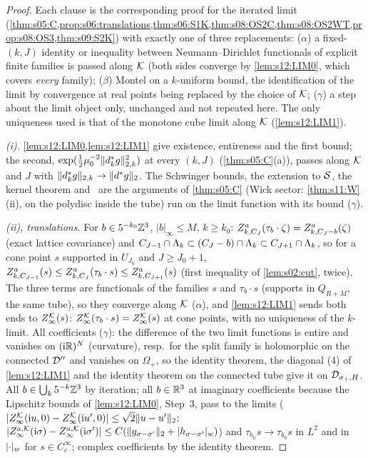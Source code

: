 \begin{proof}
Each clause is the corresponding proof for the iterated limit (\cref{thm:s05:C,prop:s06:translations,thm:s06:S1K,thm:s08:OS2C,thm:s08:OS2WT,prop:s08:OS3,thm:s09:S2K}) with exactly one of three replacements: ($\alpha$) a fixed-$(k,J)$ identity or inequality between Neumann--Dirichlet functionals of explicit finite families is passed along $\mathcal K$ (both sides converge by \cref{lem:s12:LIM0}, which covers \emph{every} family); ($\beta$) Montel on a $k$-uniform bound, the identification of the limit by convergence at real points being replaced by the choice of $\mathcal K$; ($\gamma$) a step about the limit object only, unchanged and not repeated here. The only uniqueness used is that of the monotone cube limit along $\mathcal K$ (\cref{lem:s12:LIM1}).

\emph{(i).} \cref{lem:s12:LIM0,lem:s12:LIM1} give existence, entireness and the first bound; the second, $\exp(\tfrac12\mu_0^{-2}\lVert d^{*}_kg\rVert^2_{2,k})$ at every $(k,J)$ (\cref{thm:s05:C}(a)), passes along $\mathcal K$ and $J$ with $\lVert d^{*}_kg\rVert_{2,k}\to\lVert d^{*} g\rVert_2$. The Schwinger bounds, the extension to $\mathcal S$, the kernel theorem and \Ezz\ are the arguments of \cref{thm:s05:C} (Wick sector: \cref{thm:s11:W}(ii), on the polydisc inside the tube) run on the limit function with its bound ($\gamma$).

\emph{(ii), translations.} For $b\in5^{-k_0}\mathbb Z^3$, $|b|_\infty\le M$, $k\ge k_0$: $Z^a_{k,C_J}(\tau_b\cdot\zeta)=Z^a_{k,C_J-b}(\zeta)$ (exact lattice covariance) and $C_{J-1}\cap\Lambda_k\subset(C_J-b)\cap\Lambda_k\subset C_{J+1}\cap\Lambda_k$, so for a cone point $s$ supported in $U_{J_0}$ and $J\ge J_0+1$, $Z^a_{k,C_{J-1}}(s)\le Z^a_{k,C_J}(\tau_b\cdot s)\le Z^a_{k,C_{J+1}}(s)$ (first inequality of \cref{lem:s02:cut}, twice). The three terms are functionals of the families $s$ and $\tau_b\cdot s$ (supports in $Q_{R+M}$, the same tube), so they converge along $\mathcal K$ ($\alpha$), and \cref{lem:s12:LIM1} sends both ends to $Z^{\mathcal K}_{\infty}(s)$: $Z^{\mathcal K}_{\infty}(\tau_b\cdot s)=Z^{\mathcal K}_{\infty}(s)$ at cone points, with no uniqueness of the $k$-limit. All coefficients ($\gamma$): the difference of the two limit functions is entire and vanishes on $(\mathrm i\mathbb R)^N$ (curvature), resp.\ for the split family is holomorphic on the connected $\mathcal D''$ and vanishes on $\Omega_+$, so the identity theorem, the diagonal (4) of \cref{lem:s12:LIM1} and the identity theorem on the connected tube give it on $\mathcal D_{\sigma_+,H}$. All $b\in\bigcup_k5^{-k}\mathbb Z^3$ by iteration; all $b\in\mathbb R^3$ at imaginary coefficients because the Lipschitz bounds of \cref{lem:s12:LIM0}, Step~3, pass to the limits ($|Z^{\mathcal K}_{\infty}(\mathrm iu,0)-Z^{\mathcal K}_{\infty}(\mathrm iu',0)|\le\sqrt2\lVert u-u'\rVert_2$; $|Z^{a,\mathcal K}_\infty(\mathrm i\sigma)-Z^{a,\mathcal K}_\infty(\mathrm i\sigma')|\le C(\lVert g_{\sigma-\sigma'}\rVert_2+\lvert h_{\sigma-\sigma'}\rvert_{w})$) and $\tau_{b_n}s\to\tau_{b_0}s$ in $L^2$ and in $\lvert \cdot\rvert_{w}$ for $s\in C^\infty_c$; complex coefficients by the identity theorem.


\end{proof}

